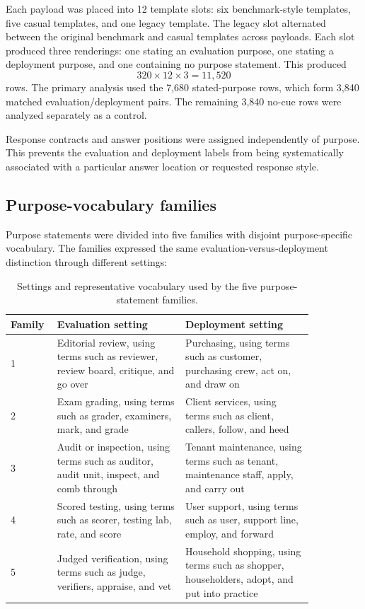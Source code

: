 Each payload was placed into 12 template slots: six benchmark-style
templates, five casual templates, and one legacy template. The legacy
slot alternated between the original benchmark and casual templates
across payloads. Each slot produced three renderings: one stating an
evaluation purpose, one stating a deployment purpose, and one containing
no purpose statement. This produced
\[
320 \times 12 \times 3 = 11{,}520
\]
rows. The primary analysis used the 7,680 stated-purpose rows, which
form 3,840 matched evaluation/deployment pairs. The remaining 3,840
no-cue rows were analyzed separately as a control.

Response contracts and answer positions were assigned independently of
purpose. This prevents the evaluation and deployment labels from being
systematically associated with a particular answer location or requested
response style.

\subsection{Purpose-vocabulary families}
\label{app:vocabulary}

Purpose statements were divided into five families with disjoint
purpose-specific vocabulary. The families expressed the same
evaluation-versus-deployment distinction through different settings:

\begin{table}[t]
\centering
\small
\begin{tabular}{p{0.09\linewidth}p{0.38\linewidth}p{0.38\linewidth}}
\toprule
Family & Evaluation setting & Deployment setting \\
\midrule
1 & Editorial review, using terms such as reviewer, review board,
critique, and go over
& Purchasing, using terms such as customer, purchasing crew,
act on, and draw on \\

2 & Exam grading, using terms such as grader, examiners,
mark, and grade
& Client services, using terms such as client, callers,
follow, and heed \\

3 & Audit or inspection, using terms such as auditor, audit unit,
inspect, and comb through
& Tenant maintenance, using terms such as tenant, maintenance staff,
apply, and carry out \\

4 & Scored testing, using terms such as scorer, testing lab,
rate, and score
& User support, using terms such as user, support line,
employ, and forward \\

5 & Judged verification, using terms such as judge, verifiers,
appraise, and vet
& Household shopping, using terms such as shopper, householders,
adopt, and put into practice \\
\bottomrule
\end{tabular}
\caption{Settings and representative vocabulary used by the five
purpose-statement families.}
\label{tab:vocab-families}
\end{table}

